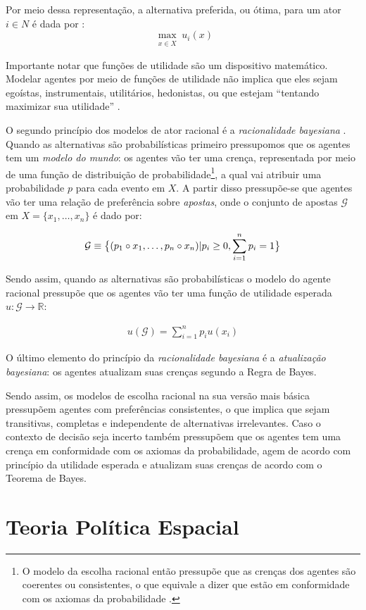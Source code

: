 Por meio dessa representação, a alternativa preferida, ou ótima, para um ator $i
\in N$ é dada por \cite{binmore2008rational}:
\[\max_{\substack{x \in  X}}
  u_i(x)
\]

Importante notar que funções de utilidade são um dispositivo matemático. Modelar
agentes por meio de funções de utilidade 
não implica que eles sejam  egoístas, instrumentais, utilitários,
hedonistas, ou que estejam ``tentando maximizar sua utilidade''
\cite{gaus2007philosophy}.

O segundo princípio dos modelos de ator racional é a \textit{racionalidade
  bayesiana} \cite{gintis2016individuality}. Quando as alternativas são
probabilísticas primeiro pressupomos que os agentes tem um \textit{modelo do
  mundo}\cite{acemoglu2011opinion}: os agentes vão ter uma crença, representada
por meio de uma função de distribuição de probabilidade\footnote{O modelo da
  escolha racional então pressupõe que as crenças dos agentes são coerentes ou
  consistentes, o que equivale a dizer que estão em conformidade com os axiomas
  da probabilidade \cite{jackman2009bayesian}.}, a qual vai atribuir uma
probabilidade \(p\) para cada evento em \(X\). A partir disso pressupõe-se que
agentes vão ter uma relação de preferência sobre
\textit{apostas}\cite{jehle2001advanced}, onde o conjunto de apostas
\(\mathcal{G}\) em \(X = \{ x_1, \ldots, x_n \}\) é dado por:

\begin{align*}
  \mathcal{G} \equiv \big{\{}  (p_1 \circ x_1, \ldots, p_n \circ x_n  ) | p_i \geq 0, \sum_{i = 1 }^n p_i = 1  \big{\}}  
\end{align*}

Sendo assim, quando as alternativas são probabilísticas o modelo do agente
racional pressupõe que os agentes vão ter uma função de utilidade esperada \(u:
\mathcal{G} \to \mathbb{R} \):

\begin{align*}
  u(\mathcal{G}) = \sum_{i =1}^n p_i u(x_i)
\end{align*}

O último elemento do princípio da \textit{racionalidade bayesiana} é a
\textit{atualização bayesiana}\cite[p.104]{gintis2016individuality}: os agentes
atualizam suas crenças segundo a Regra de Bayes.

Sendo assim, os modelos de escolha racional na sua versão mais básica pressupõem
agentes com preferências consistentes, o que implica que sejam transitivas,
completas e independente de alternativas irrelevantes. Caso o contexto de
decisão seja incerto também pressupõem que os agentes tem uma crença em
conformidade com os axiomas da probabilidade, agem de acordo com princípio da
utilidade esperada e atualizam suas crenças de acordo com o Teorema de Bayes.



\section{Teoria Política Espacial}
 











